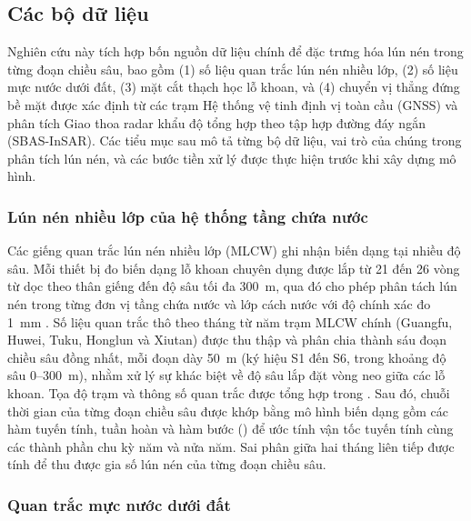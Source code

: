 
\subsection{Các bộ dữ liệu}
\label{subsec:datasets}

Nghiên cứu này tích hợp bốn nguồn dữ liệu chính để đặc trưng hóa lún nén trong từng đoạn chiều sâu, bao gồm (1) số liệu quan trắc lún nén nhiều lớp, (2) số liệu mực nước dưới đất, (3) mặt cắt thạch học lỗ khoan, và (4) chuyển vị thẳng đứng bề mặt được xác định từ các trạm Hệ thống vệ tinh định vị toàn cầu (GNSS) và phân tích Giao thoa radar khẩu độ tổng hợp theo tập hợp đường đáy ngắn (SBAS-InSAR). Các tiểu mục sau mô tả từng bộ dữ liệu, vai trò của chúng trong phân tích lún nén, và các bước tiền xử lý được thực hiện trước khi xây dựng mô hình.

\subsubsection{Lún nén nhiều lớp của hệ thống tầng chứa nước}

Các giếng quan trắc lún nén nhiều lớp (MLCW) ghi nhận biến dạng tại nhiều độ sâu. Mỗi thiết bị đo biến dạng lỗ khoan chuyên dụng được lắp từ 21 đến 26 vòng từ dọc theo thân giếng đến độ sâu tối đa 300~m, qua đó cho phép phân tách lún nén trong từng đơn vị tầng chứa nước và lớp cách nước với độ chính xác đo 1~mm \citep{hung_measuring_2021}. Số liệu quan trắc thô theo tháng từ năm trạm MLCW chính (Guangfu, Huwei, Tuku, Honglun và Xiutan) được thu thập và phân chia thành sáu đoạn chiều sâu đồng nhất, mỗi đoạn dày 50~m (ký hiệu S1 đến S6, trong khoảng độ sâu 0--300~m), nhằm xử lý sự khác biệt về độ sâu lắp đặt vòng neo giữa các lỗ khoan. Tọa độ trạm và thông số quan trắc được tổng hợp trong . Sau đó, chuỗi thời gian của từng đoạn chiều sâu được khớp bằng mô hình biến dạng gồm các hàm tuyến tính, tuần hoàn và hàm bước () để ước tính vận tốc tuyến tính cùng các thành phần chu kỳ năm và nửa năm. Sai phân giữa hai tháng liên tiếp được tính để thu được gia số lún nén của từng đoạn chiều sâu.

\subsubsection{Quan trắc mực nước dưới đất}

